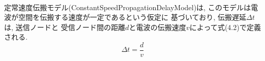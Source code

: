 \\
\indent 定常速度伝搬モデル(ConstantSpeedPropagationDelayModel)は, 
このモデルは電波が空間を伝搬する速度が一定であるという仮定に
基づいており, 伝搬遅延$\Delta t$は, 送信ノードと
受信ノード間の距離$d$と電波の伝搬速度$v$によって式(4.2)で定義される.
\begin{equation}
  \Delta t = \frac{d}{v}
\end{equation}